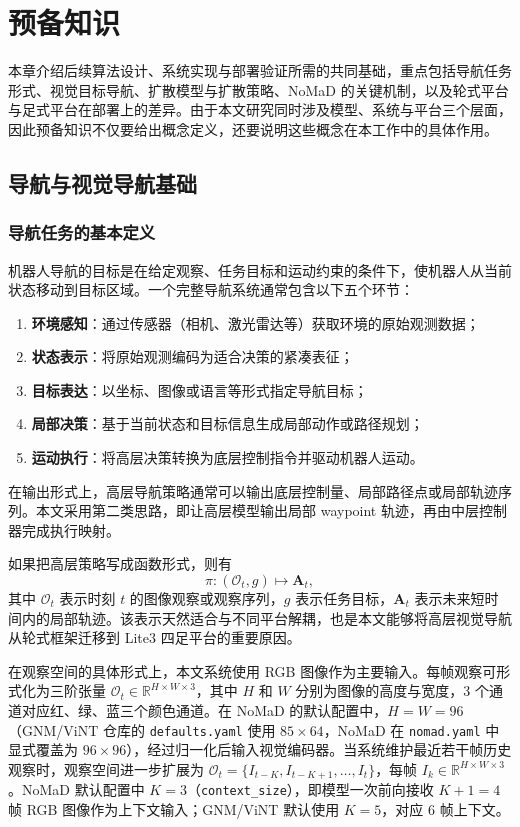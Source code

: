 
\chapter{预备知识}

本章介绍后续算法设计、系统实现与部署验证所需的共同基础，重点包括导航任务形式、视觉目标导航、扩散模型与扩散策略、NoMaD 的关键机制，以及轮式平台与足式平台在部署上的差异。由于本文研究同时涉及模型、系统与平台三个层面，因此预备知识不仅要给出概念定义，还要说明这些概念在本工作中的具体作用。

\section{导航与视觉导航基础}

\subsection{导航任务的基本定义}

机器人导航的目标是在给定观察、任务目标和运动约束的条件下，使机器人从当前状态移动到目标区域。一个完整导航系统通常包含以下五个环节\cite{thrun2005probabilistic,anderson2018evaluation}：
\begin{enumerate}
    \item \textbf{环境感知}：通过传感器（相机、激光雷达等）获取环境的原始观测数据；
    \item \textbf{状态表示}：将原始观测编码为适合决策的紧凑表征；
    \item \textbf{目标表达}：以坐标、图像或语言等形式指定导航目标；
    \item \textbf{局部决策}：基于当前状态和目标信息生成局部动作或路径规划；
    \item \textbf{运动执行}：将高层决策转换为底层控制指令并驱动机器人运动。
\end{enumerate}
在输出形式上，高层导航策略通常可以输出底层控制量、局部路径点或局部轨迹序列。本文采用第二类思路，即让高层模型输出局部 waypoint 轨迹，再由中层控制器完成执行映射。

如果把高层策略写成函数形式，则有
\begin{equation}
\pi : (\mathcal{O}_t, g) \mapsto \mathbf{A}_t ,
\end{equation}
其中 $\mathcal{O}_t$ 表示时刻 $t$ 的图像观察或观察序列，$g$ 表示任务目标，$\mathbf{A}_t$ 表示未来短时间内的局部轨迹。该表示天然适合与不同平台解耦，也是本文能够将高层视觉导航从轮式框架迁移到 Lite3 四足平台的重要原因。

在观察空间的具体形式上，本文系统使用 RGB 图像作为主要输入。每帧观察可形式化为三阶张量 $\mathcal{O}_t \in \mathbb{R}^{H \times W \times 3}$，其中 $H$ 和 $W$ 分别为图像的高度与宽度，3 个通道对应红、绿、蓝三个颜色通道。在 NoMaD 的默认配置中，$H = W = 96$（GNM/ViNT 仓库的 \texttt{defaults.yaml} 使用 $85 \times 64$，NoMaD 在 \texttt{nomad.yaml} 中显式覆盖为 $96 \times 96$），经过归一化后输入视觉编码器。当系统维护最近若干帧历史观察时，观察空间进一步扩展为 $\mathcal{O}_t = \{I_{t-K}, I_{t-K+1}, \ldots, I_t\}$，每帧 $I_k \in \mathbb{R}^{H \times W \times 3}$。NoMaD 默认配置中 $K = 3$（\texttt{context\_size}），即模型一次前向接收 $K+1=4$ 帧 RGB 图像作为上下文输入；GNM/ViNT 默认使用 $K=5$，对应 6 帧上下文。

